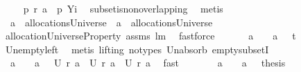 \begin{isabellebody}
\ \isanewline
\ \ {}{\isacharcolon}\ {\isachardoublequoteopen}{\isacharquery}p\ {\isacharparenleft}{\isacharquery}r\ {\isacharquery}a{}{\isacharparenright}\ {\isacharampersand}\ {\isacharquery}p\ {\isacharquery}Yi{\isachardoublequoteclose}\ \isamarkupfalse%
\ subset{\isacharunderscore}is{\isacharunderscore}non{\isacharunderscore}overlapping\ \isamarkupfalse%
\ metis\ \isamarkupfalse%
\ \isanewline
\ \ {\isachardoublequoteopen}{\isacharquery}a{}\ {\isasymin}\ allocationsUniverse\ {\isacharampersand}\ {\isacharquery}a{}\ {\isasymin}\ allocationsUniverse{\isachardoublequoteclose}\ \isamarkupfalse%
\ allocationUniverseProperty\ assms{\isacharparenleft}{}{\isacharparenright}\ lm{}{}\ \isamarkupfalse%
\ fastforce\ \isamarkupfalse%
\ \isamarkupfalse%
\ \isanewline
\ \ {\isachardoublequoteopen}{\isacharparenleft}{\isacharquery}a{}\ {\isacharequal}\ {\isacharbraceleft}{\isacharbraceright}\ {\isasymor}\ {\isacharquery}a{}\ {\isacharequal}\ {\isacharbraceleft}{\isacharbraceright}{\isacharparenright}{\isasymlongrightarrow}\ {\isacharquery}t{}{\isachardoublequoteclose}\ \isamarkupfalse%
\ Un{\isacharunderscore}empty{\isacharunderscore}left\ \isamarkupfalse%
\ {\isacharparenleft}metis\ {\isacharparenleft}lifting{\isacharcomma}\ no{\isacharunderscore}types{\isacharparenright}\ Un{\isacharunderscore}absorb{}\ empty{\isacharunderscore}subsetI{\isacharparenright}\ \isamarkupfalse%
\ \isamarkupfalse%
\ \isanewline
\ \ {\isachardoublequoteopen}{\isacharparenleft}{\isacharquery}a{}\ {\isacharequal}\ {\isacharbraceleft}{\isacharbraceright}\ {\isasymor}\ {\isacharquery}a{}\ {\isacharequal}\ {\isacharbraceleft}{\isacharbraceright}{\isacharparenright}{\isasymlongrightarrow}\ {\isacharquery}U\ {\isacharparenleft}{\isacharquery}r\ a{\isacharparenright}\ {\isacharequal}\ {\isacharquery}U\ {\isacharparenleft}{\isacharquery}r\ {\isacharquery}a{}{\isacharparenright}\ {\isasymunion}\ {\isacharquery}U\ {\isacharparenleft}{\isacharquery}r\ {\isacharquery}a{}{\isacharparenright}{\isachardoublequoteclose}\ \isamarkupfalse%
\ fast\ \isamarkupfalse%
\ \isamarkupfalse%
\ \isanewline
\ \ {}{\isacharcolon}\ {\isachardoublequoteopen}{\isacharparenleft}{\isacharquery}a{}\ {\isacharequal}\ {\isacharbraceleft}{\isacharbraceright}\ {\isasymor}\ {\isacharquery}a{}\ {\isacharequal}\ {\isacharbraceleft}{\isacharbraceright}{\isacharparenright}{\isasymlongrightarrow}\ {\isacharquery}thesis{\isachardoublequoteclose}\ \isamarkupfalse%

\end{isabellebody}
